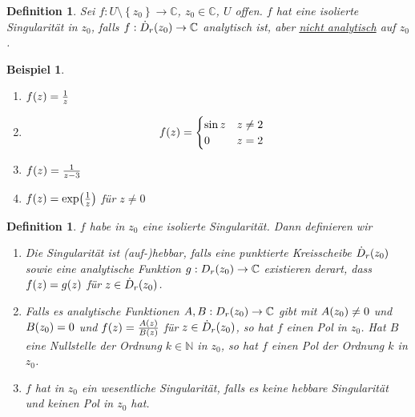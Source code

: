 \documentclass[11pt, a4paper]{article}
\theoremstyle{plain}
\newtheorem{definition}[blockelement]{Definition}
\newtheorem{beispiel}[blockelement]{Beispiel}
\numberwithin{equation}{subsection}
\newcommand{\set}[1]{\left\{#1\right\}}
\newcommand{\of}[1]{\mathopen{}\mathclose{}\bgroup\left(#1\aftergroup\egroup\right)}
\newcommand{\theoremescape}{\leavevmode}
\newcommand{\N}{\mathbb{N}}
\newcommand{\C}{\mathbb{C}}
\begin{document}
    \begin{definition}
        Sei $f: U \setminus\set{z_0} \to \C$, $z_0\in\C$, $U$ offen. $f$ hat eine isolierte Singularität in $z_0$, falls $f: \dot D_r\of{z_0}\to\C$ analytisch ist, aber \underline{nicht analytisch} auf $z_0$.
    \end{definition}

    \begin{beispiel}
        \theoremescape
        \begin{enumerate}
            \item $f\of{z} = \frac{1}{z}$
            \item \begin{align*}
                      f\of{z} &= \begin{cases}
                                     \sin z &z\neq 2\\
                                     0 &z = 2
                      \end{cases}
            \end{align*}
            \item $f\of{z} = \frac{1}{z-3}$
            \item $f\of{z} = \exp\of{\frac{1}{z}}$ für $z\neq 0$
        \end{enumerate}
    \end{beispiel}

    \begin{definition}
        $f$ habe in $z_0$ eine isolierte Singularität. Dann definieren wir
        \begin{enumerate}
            \item Die Singularität ist (auf-)hebbar, falls eine punktierte Kreisscheibe $\dot D_r\of{z_0}$ sowie eine analytische Funktion $g: D_r\of{z_0} \to \C$ existieren derart, dass $f\of{z} = g\of{z}$ für $z\in\dot D_r\of{z_0}$.
            \item Falls es analytische Funktionen $A, B: D_r\of{z_0}\to\C$ gibt mit $A\of{z_0}\neq 0$ und $B\of{z_0} = 0$ und $f\of{z} = \frac{A\of{z}}{B\of{z}}$ für $z\in\dot D_r\of{z_0}$, so hat $f$ einen Pol in $z_0$. Hat $B$ eine Nullstelle der Ordnung $k\in\N$ in $z_0$, so hat $f$ einen Pol der Ordnung $k$ in $z_0$.
            \item $f$ hat in $z_0$ ein wesentliche Singularität, falls es keine hebbare Singularität und keinen Pol in $z_0$ hat.
        \end{enumerate}
    \end{definition}
\end{document}
